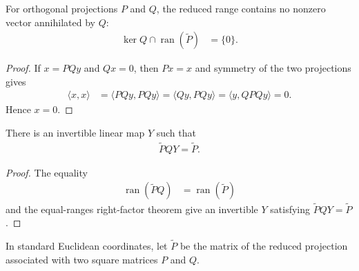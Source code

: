 \begin{lemma}
    \label{thm:mpu_two_projection_reduced_projection_transversality}
    \leanok
    For orthogonal projections $P$ and $Q$, the reduced range contains no
    nonzero vector annihilated by $Q$:
    \begin{align}
        \ker Q\cap\operatorname{ran}(\widetilde P) & =\{0\}.
        \label{eq:mpu_reduced_projection_transversality}
    \end{align}
\end{lemma}

\begin{proof}\leanok
    If $x=PQy$ and $Qx=0$, then $Px=x$ and symmetry of the two projections gives
    \begin{align}
        \langle x,x\rangle
         & =\langle PQy,PQy\rangle
        =\langle Qy,PQy\rangle
        =\langle y,QPQy\rangle
        =0.
    \end{align}
    Hence $x=0$.
\end{proof}

\begin{lemma}
    \label{thm:mpu_two_projection_reduced_projection_right_factor}
    \leanok
    There is an invertible linear map $Y$ such that
    \begin{align}
        \widetilde P QY=\widetilde P.
    \end{align}
\end{lemma}

\begin{proof}\leanok
    The equality
    \begin{align}
        \operatorname{ran}(\widetilde P Q) & =\operatorname{ran}(\widetilde P)
    \end{align}
    and the equal-ranges right-factor theorem give an invertible $Y$ satisfying
    $\widetilde P QY=\widetilde P$.
\end{proof}

\begin{definition}
    \label{def:mpu_matrix_reduced_projection}
    \leanok
    In standard Euclidean coordinates, let $\widetilde P$ be the matrix of the
    reduced projection associated with two square matrices $P$ and $Q$.
\end{definition}

